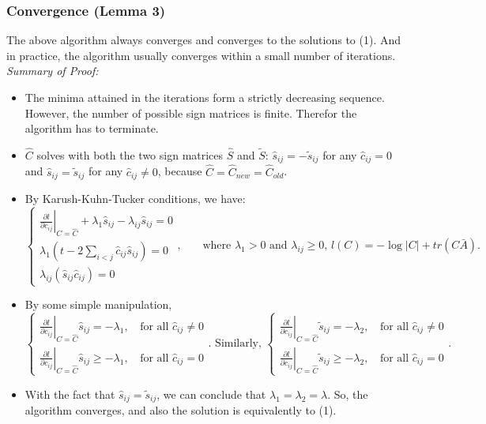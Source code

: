 \subsubsection*{Convergence (Lemma 3)}
The above algorithm always converges and converges to the solutions to (1). And in practice, the algorithm usually converges within a small number of iterations. \\
\emph{Summary of Proof: }
\begin{itemize}
\item The minima attained in the iterations form a strictly decreasing sequence. However, the number of possible sign matrices is finite. Therefor the algorithm has to terminate. 
\item $\hat{C}$ solves with both the two sign matrices $\hat{S}$ and $\tilde{S}$: $\hat{s}_{ij}=-\tilde{s}_{ij}$ for any $\hat{c}_{ij}=0$ and $\hat{s}_{ij}=\tilde{s}_{ij}$ for any $\hat{c}_{ij}\neq 0$, because $\hat{C}=\hat{C}_{new}=\hat{C}_{old}$.
\item By Karush-Kuhn-Tucker conditions, we have: \[\left\lbrace
\begin{array}{l}
\left.\frac{\partial l}{\partial c_{ij}}\right\vert_{C=\hat{C}}+\lambda_1 \hat{s}_{ij}-\lambda_{ij}\hat{s}_{ij}=0\\
\lambda_1\left(t-2\sum_{i<j}\hat{c}_{ij}\hat{s}_{ij}\right)=0\\
\lambda_{ij}\left(\hat{s}_{ij}\hat{c}_{ij}\right)=0
\end{array}\right.
\mbox{,}\qquad \mbox{where }\lambda_1>0\mbox{ and }\lambda_{ij}\geq 0\mbox{, }l(C)=-\log|C|+tr(C\bar{A})\mbox{.}\]
\item By some simple manipulation, \[\left\lbrace
\begin{array}{ll}
\left. \frac{\partial l}{\partial c_{ij}}\right\vert_{C=\hat{C}}\hat{s}_{ij}=-\lambda_1\mbox{, } & \mbox{for all }\hat{c}_{ij}\neq 0\\
 \left. \frac{\partial l}{\partial c_{ij}}\right\vert_{C=\hat{C}}\hat{s}_{ij}\geq -\lambda_1\mbox{, } & \mbox{for all }\hat{c}_{ij}= 0
\end{array}\right.
\mbox{. Similarly, }\left\lbrace
\begin{array}{ll}
\left. \frac{\partial l}{\partial c_{ij}}\right\vert_{C=\hat{C}}\tilde{s}_{ij}=-\lambda_2\mbox{, } & \mbox{for all }\hat{c}_{ij}\neq 0\\
 \left. \frac{\partial l}{\partial c_{ij}}\right\vert_{C=\hat{C}}\tilde{s}_{ij}\geq -\lambda_2\mbox{, } & \mbox{for all }\hat{c}_{ij}= 0
\end{array}\right.\mbox{.}
\]
\item With the fact that $\hat{s}_{ij}=\tilde{s}_{ij}$, we can conclude that $\lambda_1=\lambda_2=\lambda$. So, the algorithm converges, and also the solution is equivalently to (1). 
\end{itemize}
